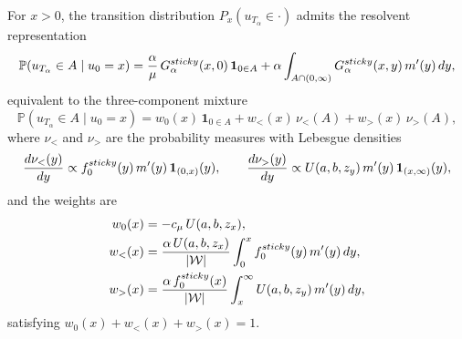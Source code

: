\documentclass[10pt,a4paper]{amsart}
\begin{document}
\begin{theorem}\label{thm:transition-dist}
  For $x>0$, the transition distribution $P_x(u_{T_\alpha}\in\cdot)$
  admits the resolvent representation
  \begin{equation}\label{eq:trans}
    \mathbb{P}(u_{T_\alpha}\in A\mid u_0=x)
    = \frac{\alpha}{\mu}\,G^{\rm sticky}_\alpha(x,0)\,\mathbf{1}_{0\in A}
    + \alpha\int_{A\cap(0,\infty)} G^{\rm sticky}_\alpha(x,y)\,m'(y)\,dy,
  \end{equation}
  equivalent to the three-component mixture
  \begin{equation}\label{eq:trans-mixture}
    \mathbb P(u_{T_\alpha}\in A\mid u_0=x)
    = w_0(x)\,\mathbf{1}_{0\in A}
    + w_<(x)\,\nu_<(A)
    + w_>(x)\,\nu_>(A),
  \end{equation}
  where $\nu_<$ and $\nu_>$ are the probability measures with Lebesgue
  densities
  \[
    \frac{d\nu_<(y)}{dy}  \propto  f_0^{\rm sticky}(y)\,m'(y)\,\mathbf{1}_{(0,x)}(y),
    \qquad
    \frac{d\nu_>(y)}{dy}  \propto  U(a,b,z_y)\,m'(y)\,\mathbf{1}_{(x,\infty)}(y),
  \]
  and the weights are
  \begin{align}
    w_0(x) &= -c_\mu\,U(a,b,z_x), \label{eq:w0}\\
    w_<(x) &= \frac{\alpha\,U(a,b,z_x)}{|\mathcal{W}|}
               \int_0^x f_0^{\rm sticky}(y)\,m'(y)\,dy, \label{eq:wlt}\\
    w_>(x) &= \frac{\alpha\,f_0^{\rm sticky}(x)}{|\mathcal{W}|}
               \int_x^\infty U(a,b,z_y)\,m'(y)\,dy, \label{eq:wgt}
  \end{align}
  satisfying $w_0(x)+w_<(x)+w_>(x)=1$.
\end{theorem}
\end{document}
